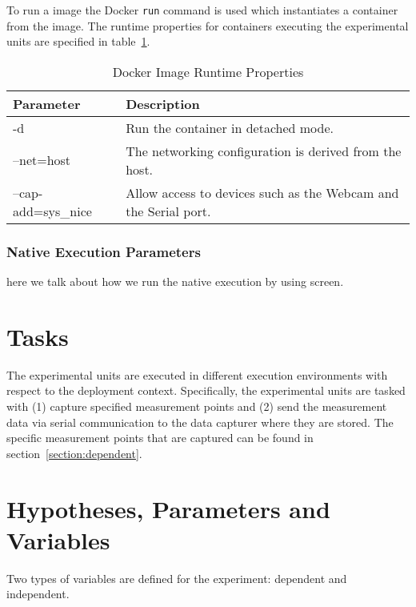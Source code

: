 To run a image the Docker \texttt{run} command is used which instantiates a container from the image. The runtime properties for containers executing the experimental units are specified in table~\ref{docker-parameters}.

\begin{table}[]
\begin{tabular}{|l|p{10cm}|}
\hline
\textbf{Parameter}  & \textbf{Description}                                            \\ \hline
-d                  & Run the container in detached mode.                             \\ \hline
--net=host          & The networking configuration is derived from the host.          \\ \hline
--cap-add=sys\_nice & Allow access to devices such as the Webcam and the Serial port. \\ \hline
\end{tabular}
\centering
\caption{Docker Image Runtime Properties}
\label{docker-parameters}
\end{table}


\subsubsection{Native Execution Parameters} 
here we talk about how we run the native execution by using screen.


\section{Tasks}
The experimental units are executed in different execution environments with respect to the deployment context. Specifically, the experimental units are tasked with (1) capture specified measurement points and (2) send the measurement data via serial communication to the data capturer where they are stored. The specific measurement points that are captured can be found in section~\ref{section:dependent}.


\section{Hypotheses, Parameters and Variables}
Two types of variables are defined for the experiment: dependent and independent. 	

